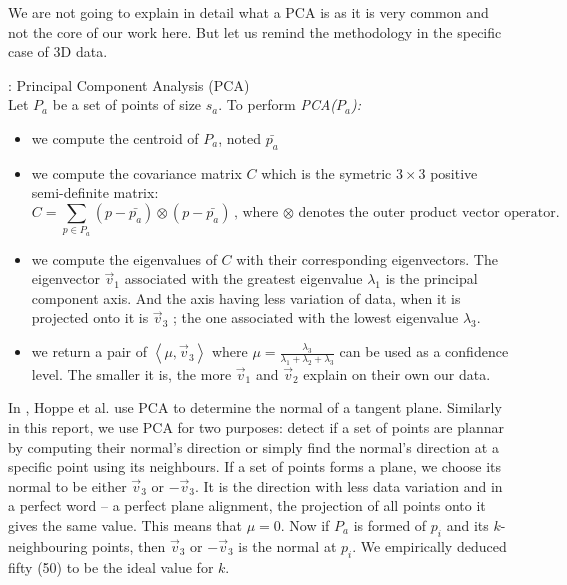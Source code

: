 We are not going to explain in detail what a PCA is as it is very common and not the core of our work here. But let us remind the methodology in the specific case of 3D data.

\begin{definition}{: Principal Component Analysis (PCA)}
\\ Let $P_a$ be a set of points of size $s_a$. To perform \textit{PCA($P_a$):}
\begin{itemize}
\item we compute the centroid of $P_a$, noted $\bar{p_a}$
\item we compute the covariance matrix $C$ which is the symetric $3 \times 3$ positive semi-definite matrix:
\begin{equation*}
C = \sum_{p \in P_a} (p - \bar{p_a}) \otimes (p - \bar{p_a}) \text{,       where $\otimes$ denotes the outer product vector operator.}
\end{equation*}
\item we compute the eigenvalues of $C$ with their corresponding eigenvectors. The eigenvector $\vec{v}_1$  associated with the greatest eigenvalue $\lambda_1$  is the principal component axis. And the axis having less variation of data, when it is projected onto it is $\vec{v}_3$ ; the one associated with the lowest eigenvalue $\lambda_3$.
\item we return a pair of $\left\langle \mu, \vec{v}_3 \right\rangle$ where $\mu = \frac{\lambda_3}{\lambda_1 + \lambda_2 + \lambda_3}$ can be used as a confidence level. The smaller it is, the more $\vec{v}_1$ and $\vec{v}_2$  explain on their own our data.
\end{itemize}
\end{definition}

In \cite{hoppe}, Hoppe et al. use PCA to determine the normal of a tangent plane. Similarly in this report, we use PCA for two purposes: detect if a set of points are plannar by computing their normal's direction or simply find the normal's direction at a specific point using its neighbours. If a set of points forms a plane, we choose its normal to be either $\vec{v}_3$ or $-\vec{v}_3$. It is the direction with less data variation and in a perfect word -- a perfect plane alignment, the projection of all points onto it gives the same value. This means that  $\mu = 0$. Now if $P_a$ is formed of $p_i$ and its $k$-neighbouring points, then $\vec{v}_3$ or $-\vec{v}_3$ is the normal at $p_i$. We empirically deduced fifty (50) to be the ideal value for $k$.


